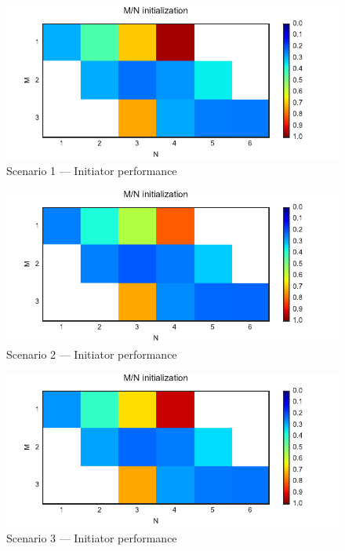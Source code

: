 \begin{figure}
 \centering
 \includegraphics{Figures/plots/Scenario1_Init-Performance.pdf}
 \caption{Scenario 1 --- Initiator performance}\label{fig:init_performance_scenario1}
\end{figure}

\begin{figure}
 \centering
 \includegraphics{Figures/plots/Scenario2_Init-Performance.pdf}
 \caption{Scenario 2 --- Initiator performance}\label{fig:init_performance_scenario2}
\end{figure}

\begin{figure}
 \centering
 \includegraphics{Figures/plots/Scenario3_Init-Performance.pdf}
 \caption{Scenario 3 --- Initiator performance}\label{fig:init_performance_scenario3}
\end{figure}

